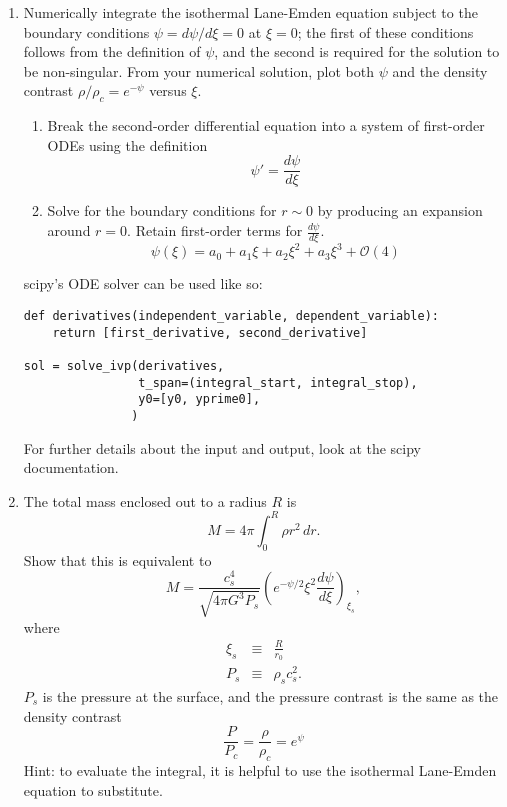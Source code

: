 \documentclass{article}
\begin{document}
\begin{enumerate}
\item Numerically integrate the isothermal Lane-Emden equation subject to the
    boundary conditions $\psi=d\psi/d\xi = 0$ at $\xi=0$; the first of these
    conditions follows from the definition of $\psi$, and the second is
    required for the solution to be non-singular. From your numerical solution,
    plot both $\psi$ and the density contrast $\rho/\rho_c = e^{-\psi}$ versus
    $\xi$.

    \begin{enumerate}
        \item Break the second-order differential equation into a system of first-order ODEs using the definition
    $$ \psi ' = \frac{d\psi}{d\xi} $$
        \item Solve for the boundary conditions for $r\sim0$ by producing an expansion around $r=0$.
            Retain first-order terms for $\frac{d \psi}{d\xi}$.
            $$ \psi(\xi) = a_0 + a_1 \xi + a_2 \xi^2 + a_3 \xi^3 + \mathcal{O}(4)$$
    \end{enumerate}

    scipy's ODE solver can be used like so:
\begin{verbatim}
def derivatives(independent_variable, dependent_variable):
    return [first_derivative, second_derivative]

sol = solve_ivp(derivatives,
                t_span=(integral_start, integral_stop),
                y0=[y0, yprime0],
               )
\end{verbatim}

For further details about the input and output, look at the scipy documentation.



\item The total mass enclosed out to a radius $R$ is
\begin{displaymath}
M = 4\pi \int_0^R \rho r^2 \, dr.
\end{displaymath}
Show that this is equivalent to
\begin{displaymath}
M =\frac{c_s^4}{\sqrt{4\pi G^3 P_s}} \left(e^{-\psi/2}\xi^2 \frac{d\psi}{d\xi}\right)_{\xi_s},
\end{displaymath}
where
\begin{eqnarray*}
\xi_s & \equiv & \frac{R}{r_0} \\
P_s & \equiv & \rho_s c_s^2.
\end{eqnarray*}
$P_s$ is the pressure at the surface, and the pressure contrast is the same as the density contrast $$\frac{P}{P_c} = \frac{\rho}{\rho_c} = e^\psi$$
Hint: to evaluate the integral, it is helpful to use the isothermal Lane-Emden equation to substitute.



\end{enumerate}
\end{document}
